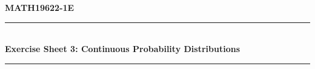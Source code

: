 \documentclass[11pt, a4paper]{article}
\begin{document}
\begin{center}
    \textbf{\large MATH19622-1E} \\
    \vspace{0.2cm}
    \rule{0.8\textwidth}{0.4pt} \\
    \vspace{0.4cm}
    \textbf{\Large Exercise Sheet 3: Continuous Probability Distributions } \\
    \vspace{0.4cm}
    \rule{0.8\textwidth}{0.4pt} \\
\end{center}
\vspace{0.6cm}


\end{document}
